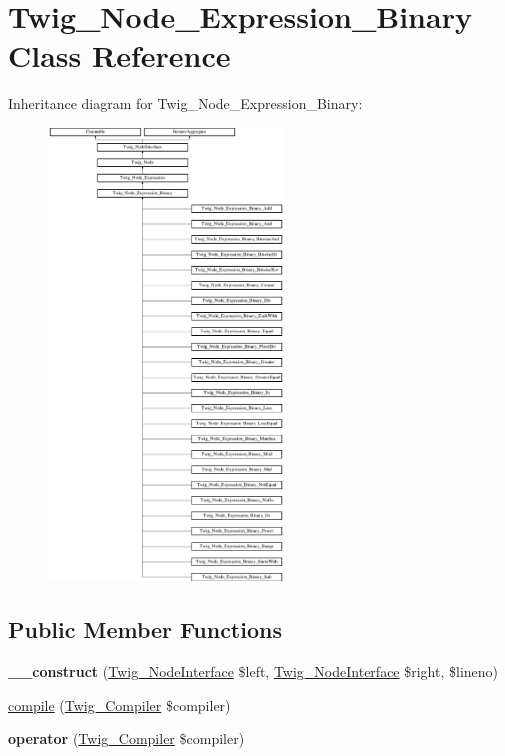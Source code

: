 \hypertarget{classTwig__Node__Expression__Binary}{}\section{Twig\+\_\+\+Node\+\_\+\+Expression\+\_\+\+Binary Class Reference}
\label{classTwig__Node__Expression__Binary}
Inheritance diagram for Twig\+\_\+\+Node\+\_\+\+Expression\+\_\+\+Binary\+:\begin{figure}[H]
\begin{center}
\leavevmode
\includegraphics[height=12.000000cm]{classTwig__Node__Expression__Binary}
\end{center}
\end{figure}
\subsection*{Public Member Functions}
\begin{DoxyCompactItemize}
\item 
{\bfseries \+\_\+\+\_\+construct} (\hyperlink{interfaceTwig__NodeInterface}{Twig\+\_\+\+Node\+Interface} \$left, \hyperlink{interfaceTwig__NodeInterface}{Twig\+\_\+\+Node\+Interface} \$right, \$lineno)\hypertarget{classTwig__Node__Expression__Binary_aa390ed165e56cb4b21812e8c4583dc91}{}\label{classTwig__Node__Expression__Binary_aa390ed165e56cb4b21812e8c4583dc91}

\item 
\hyperlink{classTwig__Node__Expression__Binary_aecc3380c7e97249e186397c9e8eaa148}{compile} (\hyperlink{classTwig__Compiler}{Twig\+\_\+\+Compiler} \$compiler)
\item 
{\bfseries operator} (\hyperlink{classTwig__Compiler}{Twig\+\_\+\+Compiler} \$compiler)\hypertarget{classTwig__Node__Expression__Binary_a548a4c2b727800b446e573485c2a7d3f}{}\label{classTwig__Node__Expression__Binary_a548a4c2b727800b446e573485c2a7d3f}

\end{DoxyCompactItemize}
